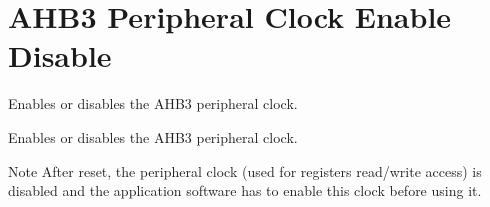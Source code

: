 \hypertarget{group___r_c_c_ex___a_h_b3___clock___enable___disable}{}\section{A\+H\+B3 Peripheral Clock Enable Disable}
\label{group___r_c_c_ex___a_h_b3___clock___enable___disable}


Enables or disables the A\+H\+B3 peripheral clock.  


Enables or disables the A\+H\+B3 peripheral clock. 

\begin{DoxyNote}{Note}
After reset, the peripheral clock (used for registers read/write access) is disabled and the application software has to enable this clock before using it. 
\end{DoxyNote}
